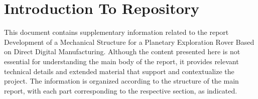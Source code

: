 \section{Introduction To Repository}
This document contains supplementary information related to the report Development of a Mechanical Structure for a Planetary Exploration Rover Based on Direct Digital Manufacturing. Although the content presented here is not essential for understanding the main body of the report, it provides relevant technical details and extended material that support and contextualize the project. The information is organized according to the structure of the main report, with each part corresponding to the respective section, as indicated.